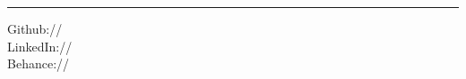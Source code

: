 
\noindent\rule{5cm}{0.4pt}
\vspace{0.2cm}

Github:// \href{https://github.com/rahulworld}{} \\
LinkedIn://  \href{https://www.linkedin.com/in/rahulworld}{} \\
Behance://  \href{https://www.behance.net/rahul_world}{}